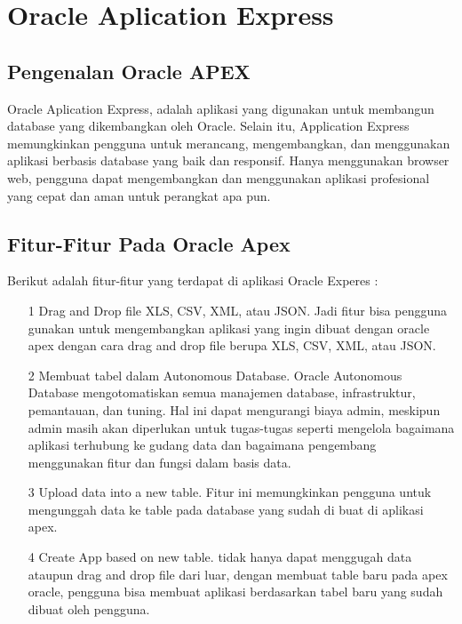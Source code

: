 \chapter{Oracle Aplication Express}

\section{Pengenalan Oracle APEX}
Oracle Aplication Express, adalah aplikasi yang digunakan untuk membangun database yang dikembangkan oleh Oracle. Selain itu, Application Express memungkinkan pengguna untuk merancang, mengembangkan, dan menggunakan aplikasi berbasis database yang baik dan responsif. Hanya menggunakan browser web, pengguna dapat mengembangkan dan menggunakan aplikasi profesional yang cepat dan aman untuk perangkat apa pun.

\section{Fitur-Fitur Pada Oracle Apex}
Berikut adalah fitur-fitur yang terdapat di aplikasi Oracle Experes :

\begin{enumerate}

\item[1]Drag and Drop file XLS, CSV, XML, atau JSON.
Jadi fitur bisa pengguna gunakan untuk mengembangkan aplikasi yang ingin dibuat dengan oracle apex dengan cara drag and drop file berupa XLS, CSV, XML, atau JSON.
    

\item[2]Membuat tabel dalam Autonomous Database. Oracle Autonomous Database mengotomatiskan semua manajemen database, infrastruktur, pemantauan, dan tuning. Hal ini dapat mengurangi biaya admin, meskipun admin masih akan diperlukan untuk tugas-tugas seperti mengelola bagaimana aplikasi terhubung ke gudang data dan bagaimana pengembang menggunakan fitur dan fungsi dalam basis data.


\item[3]Upload data into a new table. Fitur ini memungkinkan pengguna untuk mengunggah data ke table pada database yang sudah di buat di aplikasi apex.

\item[4]Create App based on new table. tidak hanya dapat menggugah data ataupun drag and drop file dari luar, dengan membuat table baru pada apex oracle, pengguna bisa membuat aplikasi berdasarkan tabel baru yang sudah dibuat oleh pengguna.\\

\end{enumerate}

